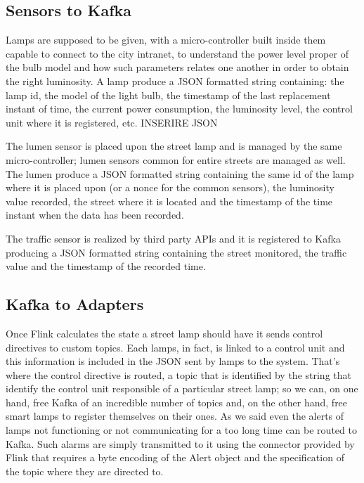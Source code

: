 \subsection{Sensors to Kafka}
Lamps are supposed to be given, with a micro-controller built inside them capable to connect to the city intranet, to understand the power level proper of the bulb model and how such parameters relates one another in order to obtain the right luminosity. A lamp produce a JSON formatted string containing: the lamp id, the model of the light bulb, the timestamp of the last replacement instant of time, the current power consumption, the luminosity level, the control unit where it is registered, etc. 
INSERIRE JSON

The lumen sensor is placed upon the street lamp and is managed by the same micro-controller; lumen sensors common for entire streets are managed as well. The lumen produce a JSON formatted string containing the same id of the lamp where it is placed upon (or a nonce for the common sensors), the luminosity value recorded, the street where it is located and the timestamp of the time instant when the data has been recorded. 

The traffic sensor is realized by third party APIs and it is registered to Kafka producing a JSON formatted string containing the street monitored, the traffic value and the timestamp of the recorded time.

\subsection{Kafka to Adapters}
Once Flink calculates the state a street lamp should have it sends control directives to custom topics. Each lamps, in fact, is linked to a control unit and this information is included in the JSON sent by lamps to the system. That’s where the control directive is routed, a topic that is identified by the string that identify the control unit responsible of a particular street lamp; so we can, on one hand, free Kafka of an incredible number of topics and, on the other hand, free smart lamps to register themselves on their ones. As we said even the alerts of lamps not functioning or not communicating for a too long time can be routed to Kafka. Such alarms are simply transmitted to it using the connector provided by Flink that requires a byte encoding of the Alert object and the specification of the topic where they are directed to. 

